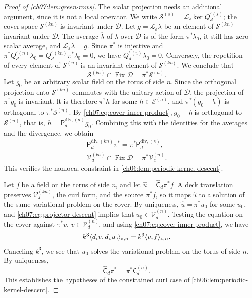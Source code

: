 \begin{proof}[Proof of \cref{ch07:lem:green-rows}]
The scalar projection needs an additional argument, since it is not a local operator. We write $\mathcal S^{(s)}=\mathscr L_\varepsilon\ker Q_d^{\prime\,(s)}$; the cover space $\mathcal S^{(kn)}$ is invariant under $\mathcal D$. Let $g=\mathscr L_\varepsilon\lambda$ be an element of $\mathcal S^{(kn)}$ invariant under $\mathcal D$. The average $\overline\lambda$ of $\lambda$ over $\mathcal D$ is of the form $\pi^*\lambda_0$, it still has zero scalar average, and $\mathscr L_\varepsilon\overline\lambda=g$. Since $\pi^*$ is injective and $\pi^*Q_d^{\prime\,(n)}\lambda_0=Q_d^{\prime\,(kn)}\pi^*\lambda_0=0$, we have $Q_d^{\prime\,(n)}\lambda_0=0$. Conversely, the repetition of every element of $\mathcal S^{(n)}$ is an invariant element of $\mathcal S^{(kn)}$. We conclude that
\[
 \mathcal S^{(kn)}\cap\operatorname{Fix}\mathcal D=\pi^*\mathcal S^{(n)}.
\]
Let $g_0$ be an arbitrary scalar field on the torus of side $n$. Since the orthogonal projection onto $\mathcal S^{(kn)}$ commutes with the unitary action of $\mathcal D$, the projection of $\pi^*g_0$ is invariant. It is therefore $\pi^*h$ for some $h\in\mathcal S^{(n)}$, and $\pi^*(g_0-h)$ is orthogonal to $\pi^*\mathcal S^{(n)}$. By \eqref{ch07:eq:cover-inner-product}, $g_0-h$ is orthogonal to $\mathcal S^{(n)}$, that is, $h=\mathsf P_d^{\mathrm{div},(n)}g_0$. Combining this with the identities for the averages and the divergence, we obtain
\begin{equation}\label{ch07:eq:projector-descent}
 \begin{gathered}
 \mathsf P_d^{\mathrm{div},(kn)}\pi^*=\pi^*\mathsf P_d^{\mathrm{div},(n)},\\
 \mathcal V_d^{(kn)}\cap\operatorname{Fix}\mathcal D=\pi^*\mathcal V_d^{(n)}.
 \end{gathered}
\end{equation}
This verifies the nonlocal constraint in \cref{ch06:lem:periodic-kernel-descent}.

Let $f$ be a field on the torus of side $n$, and let $\widehat u=\widehat{\mathsf C}_d\pi^*f$. A deck translation preserves $\mathcal V_d^{(kn)}$, the curl form, and the source $\pi^*f$, so it maps $\widehat u$ to a solution of the same variational problem on the cover. By uniqueness, $\widehat u=\pi^*u_0$ for some $u_0$, and \eqref{ch07:eq:projector-descent} implies that $u_0\in\mathcal V_d^{(n)}$. Testing the equation on the cover against $\pi^*v$, $v\in\mathcal V_d^{(n)}$, and using \eqref{ch07:eq:cover-inner-product}, we have
\[
 k^3\langle d_\varepsilon v,d_\varepsilon u_0\rangle_{\varepsilon,n}=k^3\langle v,f\rangle_{\varepsilon,n}.
\]
Canceling $k^3$, we see that $u_0$ solves the variational problem on the torus of side $n$. By uniqueness,
\begin{equation}\label{ch07:eq:covariance-descent}
 \widehat{\mathsf C}_d\pi^*=\pi^*\mathsf C_d^{(n)}.
\end{equation}
This establishes the hypotheses of the constrained curl case of \cref{ch06:lem:periodic-kernel-descent}.


\end{proof}

